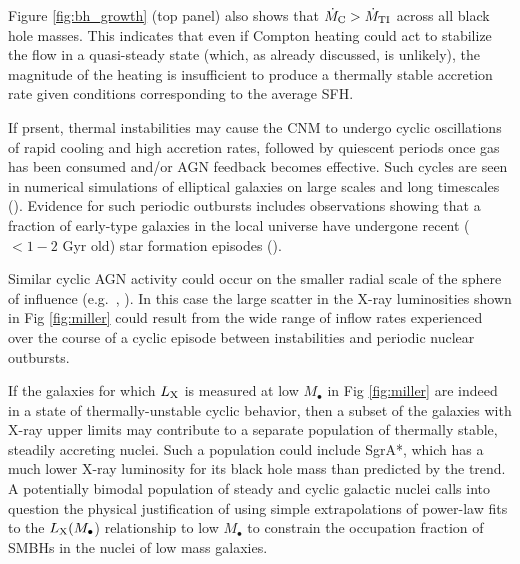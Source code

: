 \documentclass[usenatbib,fleqn]{mn2e}
\begin{document}
Figure \ref{fig:bh_growth} (top panel) also shows that $\dot{M}_{\rm
  C} > \dot{M}_{\rm TI}$ across all black hole masses.  This indicates that even if
Compton heating could act to stabilize the flow in a quasi-steady state (which, as already discussed, is unlikely), the magnitude of the heating is insufficient to produce a thermally stable accretion rate given conditions
corresponding to the average SFH.  

If prsent, thermal
instabilities may cause the CNM to undergo cyclic
oscillations of rapid cooling and high accretion rates, followed by
quiescent periods once gas has been consumed and/or AGN feedback
becomes effective.  Such cycles are seen in numerical simulations of
elliptical galaxies on large scales and long timescales
(\citealt{Ciotti+10}).  Evidence for such periodic outbursts includes observations
showing that a fraction of early-type galaxies in the local universe
have undergone recent ($< 1-2$ Gyr old) star formation episodes
(\citealt{Donas+07}).

Similar cyclic AGN activity could occur on the smaller radial scale of
the sphere of influence (e.g.~\citealt{Yuan&Li11},
\citealt{Cuadra+15}).  In this case the large scatter in the X-ray
luminosities shown in Fig \ref{fig:miller} could result from the wide
range of inflow rates experienced over the course of a cyclic episode
between instabilities and periodic nuclear outbursts. 



If the galaxies for which $L_{\rm X}$ is measured at low $M_{\bullet}$ in Fig
\ref{fig:miller} are indeed in a state of thermally-unstable cyclic behavior, then a subset of the galaxies with X-ray upper limits may contribute to a separate population of thermally stable, steadily accreting nuclei.  Such a population could include SgrA*, which has a much lower X-ray luminosity for its black hole mass than predicted by the \citet{Miller+15} trend.  A potentially bimodal population of steady and cyclic galactic nuclei calls into question the physical justification of using simple extrapolations of power-law fits to the $L_{\rm X}(M_{\bullet}$) relationship to low $M_{\bullet}$ to constrain the occupation fraction of SMBHs in the nuclei of low mass galaxies.
\end{document}
